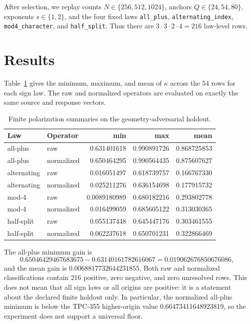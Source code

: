 \documentclass[10pt]{article}
\newcommand{\kappaout}{\kappa}
\begin{document}
After selection, we replay counts $N\in\{256,512,1024\}$, anchors
$Q\in\{24,54,80\}$, exponents $s\in\{1,2\}$, and the four fixed laws
\texttt{all\_plus}, \texttt{alternating\_index},
\texttt{mod4\_character}, and \texttt{half\_split}.  Thus there are
$3\cdot3\cdot2\cdot4=216$ law-level rows.

\section{Results}

Table~\ref{tab:summary} gives the minimum, maximum, and mean of
$\kappaout$ across the 54 rows for each sign law.  The raw and normalized
operators are evaluated on exactly the same source and response vectors.

\begin{table}[t]
\centering
\caption{Finite polarization summaries on the geometry-adversarial holdout.}
\label{tab:summary}
\small
\begin{tabular}{llrrr}
\toprule
Law & Operator & min & max & mean\\
\midrule
all-plus & raw & 0.631401618 & 0.990891726 & 0.868725853\\
all-plus & normalized & 0.650464295 & 0.990564435 & 0.875607627\\
alternating & raw & 0.016051497 & 0.618739757 & 0.166767330\\
alternating & normalized & 0.025211276 & 0.636154698 & 0.177915732\\
mod-4 & raw & 0.0089180989 & 0.680182216 & 0.293802778\\
mod-4 & normalized & 0.016499059 & 0.685605122 & 0.313030365\\
half-split & raw & 0.055137448 & 0.645447176 & 0.303461555\\
half-split & normalized & 0.062237618 & 0.650701231 & 0.322866469\\
\bottomrule
\end{tabular}
\end{table}

The all-plus minimum gain is
\[
 0.65046429467683675-0.63140161782616067
 =0.019062676850676086,
\]
and the mean gain is
$0.0068817732644231855$.  Both raw and normalized classifications contain
216 positive, zero negative, and zero unresolved rows.  This does not mean
that all sign laws or all origins are positive: it is a statement about the
declared finite holdout only.  In particular, the normalized all-plus
minimum is below the TPC-355 higher-origin value
0.66473411648923819, so the experiment does not support a universal floor.
\end{document}
